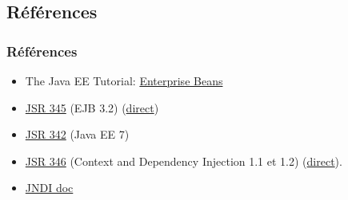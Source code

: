 \documentclass[english, french]{beamer}
\begin{document}
\subsection{Références}
\begin{frame}
	\frametitle{Références}
	\begin{itemize}
		\item The Java EE Tutorial: \href{http://docs.oracle.com/javaee/7/tutorial/partentbeans.htm}{Enterprise Beans}
		\item \href{https://www.jcp.org/en/jsr/detail?id=345}{JSR 345} (EJB 3.2) (\href{http://download.oracle.com/otn-pub/jcp/ejb-3_2-fr-eval-spec/ejb-3_2-core-fr-spec.pdf}{direct})
		\item \href{https://www.jcp.org/en/jsr/detail?id=342}{JSR 342} (Java EE 7)
		\item \href{http://jcp.org/en/jsr/detail?id=346}{JSR 346} (Context and Dependency Injection 1.1 et 1.2) (\href{http://download.oracle.com/otn-pub/jcp/cdi-1_2-mrel-eval-spec/cdi-1.2.pdf}{direct}).
		\item \href{http://docs.oracle.com/javase/8/docs/technotes/guides/jndi/}{JNDI doc}
	\end{itemize}
\end{frame}
\end{document}
